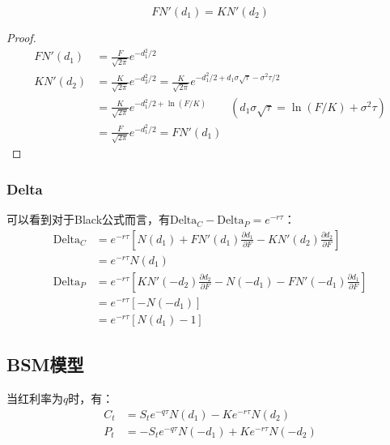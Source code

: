 \documentclass[11pt]{article}
\begin{document}
\begin{lemma}
    \begin{equation*}
        F N'(d_1) = K N'(d_2)
    \end{equation*}
\end{lemma}

\begin{proof}
    \begin{align*}
        FN'(d_1) &= \frac{F}{\sqrt{2\pi}}e^{-d_1^2/2} \\
        KN'(d_2) &= \frac{K}{\sqrt{2\pi}}e^{-d_2^2/2} = \frac{K}{\sqrt{2\pi}}e^{-d_1^2/2+d_1\sigma\sqrt{\tau}-\sigma^2\tau/2} \\
        &= \frac{K}{\sqrt{2\pi}}e^{-d_1^2/2+\ln(F/K)} 
        \qquad \left(d_1\sigma\sqrt{\tau} = \ln(F/K)+\sigma^2\tau\right) \\
        &= \frac{F}{\sqrt{2\pi}}e^{-d_1^2/2} = FN'(d_1)
    \end{align*}
\end{proof}

\subsubsection{Delta}

可以看到对于Black公式而言，有$\text{Delta}_C - \text{Delta}_P = e^{-r\tau}$：
\begin{align*}
    \text{Delta}_C &= e^{-r\tau}\left[N(d_1) + FN'(d_1)\frac{\partial d_1}{\partial F} - KN'(d_2)\frac{\partial d_2}{\partial F}\right] \\
    &= e^{-r\tau}N(d_1) \\
    \text{Delta}_P &= e^{-r\tau}\left[KN'(-d_2)\frac{\partial d_2}{\partial F} - N(-d_1) - FN'(-d_1)\frac{\partial d_1}{\partial F}\right] \\
    &= e^{-r\tau}\left[ -N(-d_1) \right] \\
    &= e^{-r\tau}\left[ N(d_1) -1 \right]
\end{align*}

\subsection{BSM模型}

当红利率为$q$时，有：
\begin{align*}
    C_t &= S_te^{-q\tau}N(d_1) - Ke^{-r\tau}N(d_2) \\
    P_t &= -S_te^{-q\tau}N(-d_1) + Ke^{-r\tau}N(-d_2)
\end{align*}
\end{document}
